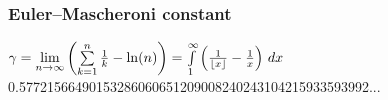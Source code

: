 \subsubsection{Euler–Mascheroni constant}
$\gamma = \lim\limits_{n \rightarrow \infty } \left( \sum\limits_{k=1}^n \frac{1}{k} - \ln(n) \right)=\int\limits_1^\infty\left({1\over\lfloor x\rfloor}-{1\over x}\right)\,dx$\\
0.57721566490153286060651209008240243104215933593992...\\
